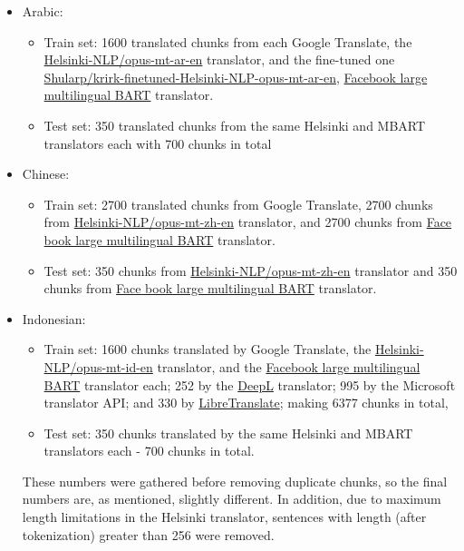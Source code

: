 \documentclass[twocolumn]{article}
\begin{document}
\begin{itemize}
	\item Arabic:
	\begin{itemize}
            \item Train set: 1600 translated chunks from each Google Translate, the \href{https://huggingface.co/Helsinki-NLP/opus-mt-ar-en}{Helsinki-NLP/opus-mt-ar-en} translator, and the fine-tuned one \href{https://huggingface.co/Shularp/krirk-finetuned-Helsinki-NLP_opus-mt-ar-en}{Shularp/krirk-finetuned-Helsinki-NLP-opus-mt-ar-en}, \href{https://huggingface.co/facebook/mbart-large-50-many-to-one-mmt}{Facebook large multilingual BART} translator.
            \item Test set: 350 translated chunks from the same Helsinki and MBART translators each with 700 chunks in total
        \end{itemize}
		\item Chinese:
        \begin{itemize}
            \item Train set: 2700 translated chunks from Google Translate, 2700 chunks from \href{https://huggingface.co/Helsinki-NLP/opus-mt-zh-en}{Helsinki-NLP/opus-mt-zh-en} translator, and 2700 chunks from \href{https://huggingface.co/facebook/mbart-large-50-many-to-one-mmt}{Face book large multilingual BART} translator.
            \item Test set: 350 chunks from \href{https://huggingface.co/Helsinki-NLP/opus-mt-zh-en}{Helsinki-NLP/opus-mt-zh-en} translator and 350 chunks from \href{https://huggingface.co/facebook/mbart-large-50-many-to-one-mmt}{Face book large multilingual BART} translator.
        \end{itemize}
	\item Indonesian:
	\begin{itemize}
		\item Train set: 1600 chunks translated by Google Translate, the \href{https://huggingface.co/Helsinki-NLP/opus-mt-id-en}{Helsinki-NLP/opus-mt-id-en} translator, and the \href{https://huggingface.co/facebook/mbart-large-50-many-to-one-mmt}{Facebook large multilingual BART} translator each; 252 by the \href{https://www.deepl.com/en/translator}{DeepL} translator; 995  by the Microsoft translator API; and 330 by \href{https://libretranslate.com/}{LibreTranslate}; making 6377 chunks in total,
		\item Test set: 350 chunks translated by the same Helsinki and MBART translators each - 700 chunks in total.
	\end{itemize}
	These numbers were gathered before removing duplicate chunks, so the final numbers are, as mentioned, slightly different. In addition, due to maximum length limitations in the Helsinki translator, sentences with length (after tokenization) greater than 256 were removed.


\end{itemize}
\end{document}
